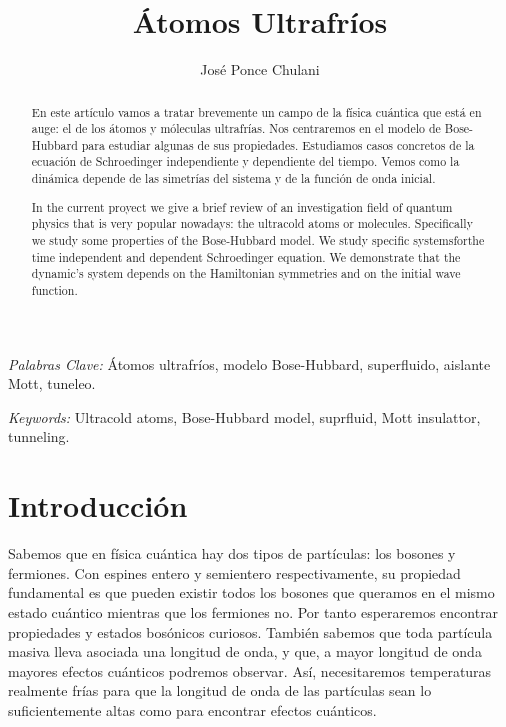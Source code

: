 \documentclass[11pt,a4paper]{article}
\begin{document}
\title{\'Atomos Ultrafr\'ios}
\author{Jos\'e Ponce Chulani}

\maketitle


\bigskip

\begin{abstract}
  En este artículo vamos a tratar brevemente un campo de la física cuántica que está en auge: el de los \'atomos y m\'oleculas ultrafr\'ias. Nos centraremos en el modelo de Bose-Hubbard para estudiar algunas de sus propiedades. Estudiamos casos concretos de la ecuación de Schroedinger independiente y dependiente del tiempo. Vemos como la dinámica depende de las simetrías del sistema y de la función de onda inicial.
\end{abstract}

\bigskip

\textit{Palabras Clave:}
Átomos ultrafríos, modelo Bose-Hubbard, superfluido, aislante Mott, tuneleo.

\newpage 

\begin{abstract}
  In the current proyect we give a brief review of an investigation field of quantum physics that is very popular nowadays: the ultracold atoms or molecules. Specifically we study some properties of the Bose-Hubbard model. We study specific systemsforthe time independent and dependent Schroedinger equation. We demonstrate that the dynamic's system depends on the Hamiltonian symmetries and on the initial wave function.
\end{abstract}

\bigskip

\textit{Keywords:}
Ultracold atoms, Bose-Hubbard model, suprfluid, Mott insulattor, tunneling.

\newpage

\section{Introducción}

Sabemos que en física cuántica hay dos tipos de partículas: los bosones y fermiones. Con espines entero y semientero respectivamente, su propiedad fundamental es que pueden existir todos los bosones que queramos en el mismo estado cuántico mientras que los fermiones no. Por tanto esperaremos encontrar propiedades y estados bosónicos curiosos. También sabemos que toda partícula masiva lleva asociada una longitud de onda, y que, a mayor longitud de onda mayores efectos cuánticos podremos observar. Así, necesitaremos temperaturas realmente frías para que la longitud de onda de las partículas sean lo suficientemente altas como para encontrar efectos cuánticos.
\end{document}

